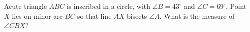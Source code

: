 Acute triangle \(ABC\) is inscribed in a circle, with \(\angle B=43^\circ\) and \(\angle C=69^\circ\). Point \(X\) lies on minor arc \(BC\) so that line \(AX\) bisects \(\angle A\). What is the measure of \(\angle CBX\)?
